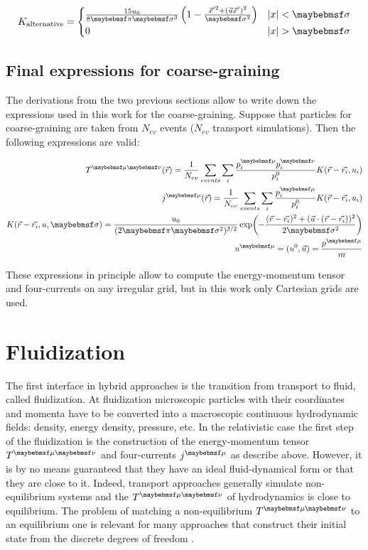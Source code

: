 \begin{equation}
  K_{\mathrm{alternative}} = \begin{cases}
    \frac{15 u_0}{8 \pi \sigma^3} \parenths{1 - \frac{\vec{x}'^2 + (\vec{u} \vec{x}')^2}{\sigma^2}} & |x| < \sigma \\
    0  & |x| > \sigma
 \end{cases}
\end{equation}

\subsection{Final expressions for coarse-graining} \label{sec:final_coarse_graining}

The derivations from the two previous sections allow to write down the expressions used
in this work for the coarse-graining. Suppose that particles for coarse-graining are
taken from $N_{ev}$ events ($N_{ev}$ transport simulations). Then the following
expressions are valid:

\begin{align}
  \Tmn(\vec{r}) = \frac{1}{N_{ev}} \sum_{events} \sum_i
                  \frac{p^{\mu}_i p^{\nu}_i}{p^0_i} K(\vec{r} - \vec{r_i}, u_i) \\
  \jmu(\vec{r}) = \frac{1}{N_{ev}} \sum_{events} \sum_i
                  \frac{p^{\mu}_i}{p^0_i} K(\vec{r} - \vec{r_i}, u_i) \\
  K(\vec{r} - \vec{r_i}, u, \sigma) = \frac{u_0}{(2\pi \sigma^2)^{3/2}}
                  \expOf{-\frac{(\vec{r} - \vec{r_i})^2 +
                                (\vec{u} \cdot (\vec{r} - \vec{r_i}))^2}{2\sigma^2}} \\
  u^{\mu} = (u^0, \vec{u}) = \frac{p^{\mu}}{m}
\end{align}

These expressions in principle allow to compute the energy-momentum tensor and
four-currents on any irregular grid, but in this work only Cartesian grids are used.

\section{Fluidization} \label{sec:fluidization}

The first interface in hybrid approaches is the transition from transport to fluid,
called fluidization. At fluidization microscopic particles with their coordinates and
momenta have to be converted into a macroscopic continuous hydrodynamic fields: density,
energy density, pressure, etc. In the relativistic case the first step of the
fluidization is the construction of the energy-momentum tensor $\Tmn$ and four-currents
$\jmu$ as describe above. However, it is by no means guaranteed that they have an ideal
fluid-dynamical form or that they are close to it. Indeed, transport
approaches generally simulate non-equilibrium systems and the $\Tmn$ of hydrodynamics
is close to equilibrium. The problem of matching a non-equilibrium $\Tmn$
to an equilibrium one is relevant for many approaches that construct their initial state
from the discrete degrees of freedom \cite{Petersen:2008dd,Skokov:2005ut,Werner:2010aa,
Andrade:2005tx,Gale:2012rq,Karpenko:2015xea,Pang:2012he,Bhalerao:2015iya}.

